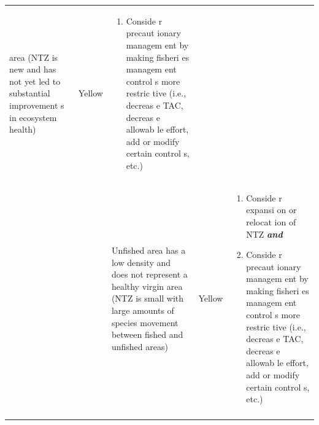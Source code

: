 \documentclass[]{book}
\providecommand{\tightlist}{%
  \setlength{\itemsep}{0pt}\setlength{\parskip}{0pt}}
\begin{document}
\begin{longtable}[]{@{}lllll@{}}
\begin{minipage}[t]{0.19\columnwidth}
area (NTZ is new and has not yet led to substantial improvement s in
ecosystem health)\strut
\end{minipage} & \begin{minipage}[t]{0.19\columnwidth}\raggedright\strut
Yellow\strut
\end{minipage} & \begin{minipage}[t]{0.19\columnwidth}\raggedright\strut
\begin{enumerate}
\def\labelenumi{\arabic{enumi}.}
\tightlist
\item
  Conside r precaut ionary managem ent by making fisheri es managem ent
  control s more restric tive (i.e., decreas e TAC, decreas e allowab le
  effort, add or modify certain control s, etc.)
\end{enumerate}\strut
\end{minipage}\tabularnewline
\begin{minipage}[t]{0.19\columnwidth}\raggedright\strut
\strut
\end{minipage} & \begin{minipage}[t]{0.19\columnwidth}\raggedright\strut
\strut
\end{minipage} & \begin{minipage}[t]{0.19\columnwidth}\raggedright\strut
Unfished area has a low density and does not represent a healthy virgin
area (NTZ is small with large amounts of species movement between fished
and unfished areas)\strut
\end{minipage} & \begin{minipage}[t]{0.19\columnwidth}\raggedright\strut
Yellow\strut
\end{minipage} & \begin{minipage}[t]{0.19\columnwidth}\raggedright\strut
\begin{enumerate}
\def\labelenumi{\arabic{enumi}.}
\item
  Conside r expansi on or relocat ion of NTZ \textbf{\emph{and} }
\item
  Conside r precaut ionary managem ent by making fisheri es managem ent
  control s more restric tive (i.e., decreas e TAC, decreas e allowab le
  effort, add or modify certain control s, etc.)
\end{enumerate}\strut
\end{minipage}\tabularnewline
\begin{minipage}[t]{0.19\columnwidth}\raggedright\strut
\strut
\end{minipage} & \begin{minipage}[t]{0.19\columnwidth}\raggedright\strut

\end{minipage}
\end{longtable}
\end{document}
